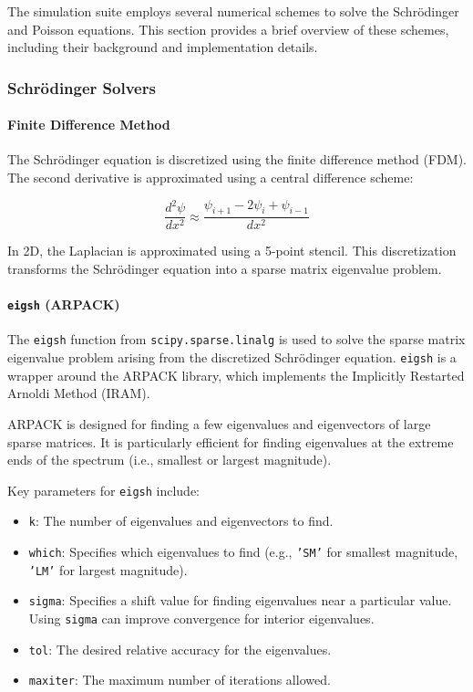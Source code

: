 \documentclass{article}
\begin{document}
The simulation suite employs several numerical schemes to solve the Schrödinger and Poisson equations. This section provides a brief overview of these schemes, including their background and implementation details.

\subsubsection{Schrödinger Solvers}

\paragraph{Finite Difference Method}
The Schrödinger equation is discretized using the finite difference method (FDM). The second derivative is approximated using a central difference scheme:

\[
	\frac{d^2\psi}{dx^2} \approx \frac{\psi_{i+1} - 2\psi_i + \psi_{i-1}}{dx^2}
\]

In 2D, the Laplacian is approximated using a 5-point stencil. This discretization transforms the Schrödinger equation into a sparse matrix eigenvalue problem.

\paragraph{\texttt{eigsh} (ARPACK)}
The \texttt{eigsh} function from \texttt{scipy.sparse.linalg} is used to solve the sparse matrix eigenvalue problem arising from the discretized Schrödinger equation. \texttt{eigsh} is a wrapper around the ARPACK library, which implements the Implicitly Restarted Arnoldi Method (IRAM).

ARPACK is designed for finding a few eigenvalues and eigenvectors of large sparse matrices. It is particularly efficient for finding eigenvalues at the extreme ends of the spectrum (i.e., smallest or largest magnitude).

Key parameters for \texttt{eigsh} include:
\begin{itemize}
	\item \texttt{k}: The number of eigenvalues and eigenvectors to find.
	\item \texttt{which}: Specifies which eigenvalues to find (e.g., \texttt{'SM'} for smallest magnitude, \texttt{'LM'} for largest magnitude).
	\item \texttt{sigma}: Specifies a shift value for finding eigenvalues near a particular value. Using \texttt{sigma} can improve convergence for interior eigenvalues.
	\item \texttt{tol}: The desired relative accuracy for the eigenvalues.
	\item \texttt{maxiter}: The maximum number of iterations allowed.
\end{itemize}
\end{document}
